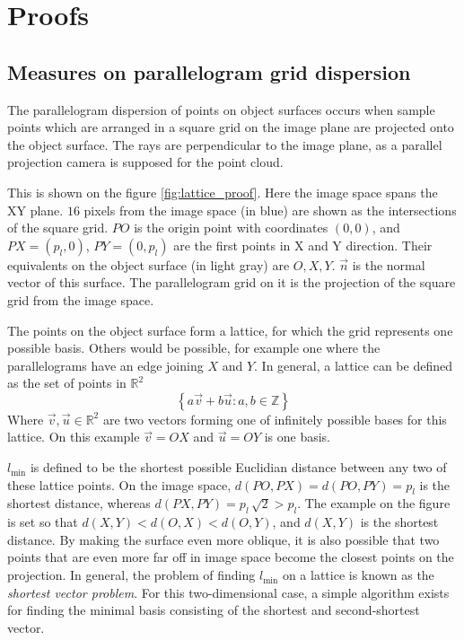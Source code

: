 \chapter{Proofs}

\section{Measures on parallelogram grid dispersion} \label{sec:proof_pargrid_measures}
The parallelogram dispersion of points on object surfaces occurs when sample points which are arranged in a square grid on the image plane are projected onto the object surface. The rays are perpendicular to the image plane, as a parallel projection camera is supposed for the point cloud.  

This is shown on the figure \ref{fig:lattice_proof}. Here the image space spans the XY plane. $16$ pixels from the image space (in blue) are shown as the intersections of the square grid. $PO$ is the origin point with coordinates $(0, 0)$, and $PX = (p_l, 0)$, $PY = (0, p_l)$ are the first points in X and Y direction. Their equivalents on the object surface (in light gray) are $O, X, Y$. $\vec{n}$ is the normal vector of this surface. The parallelogram grid on it is the projection of the square grid from the image space.

The points on the object surface form a lattice, for which the grid represents one possible basis. Others would be possible, for example one where the parallelograms have an edge joining $X$ and $Y$. In general, a lattice can be defined as the set of points in $\mathbb{R}^2$
\begin{equation}
\left\{ a \vec{v} + b \vec{u} : a,b \in \mathbb{Z} \right\}
\end{equation}
Where $\vec{v}, \vec{u} \in \mathbb{R}^2$ are two vectors forming one of infinitely possible bases for this lattice. On this example $\vec{v} = OX$ and $\vec{u} = OY$ is one basis.

$l_\text{min}$ is defined to be the shortest possible Euclidian distance between any two of these lattice points. On the image space, $d(PO, PX) = d(PO, PY) = p_l$ is the shortest distance, whereas $d(PX, PY) = p_l \, \sqrt{2} > p_l$. The example on the figure is set so that $d(X, Y) < d(O, X) < d(O, Y)$, and $d(X, Y)$ is the shortest distance. By making the surface even more oblique, it is also possible that two points that are even more far off in image space become the closest points on the projection. In general, the problem of finding $l_\text{min}$ on a lattice is known as the \emph{shortest vector problem}. For this two-dimensional case, a simple algorithm exists for finding the minimal basis consisting of the shortest and second-shortest vector. \cite{Galb2012}

